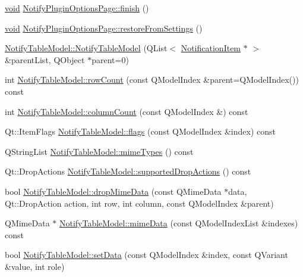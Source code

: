 \begin{DoxyCompactItemize}
\item 
\hyperlink{group___u_a_v_objects_plugin_ga444cf2ff3f0ecbe028adce838d373f5c}{void} \hyperlink{group___notify_plugin_gaa13ff08a62eca11b672d5f7d88fa7c40}{\-Notify\-Plugin\-Options\-Page\-::finish} ()
\item 
\hyperlink{group___u_a_v_objects_plugin_ga444cf2ff3f0ecbe028adce838d373f5c}{void} \hyperlink{group___notify_plugin_ga2607c7c5d3db72401fe48f07838d36ce}{\-Notify\-Plugin\-Options\-Page\-::restore\-From\-Settings} ()
\item 
\hyperlink{group___notify_plugin_ga7c99d26f6ccdab1cb80b8cfdfaa9d814}{\-Notify\-Table\-Model\-::\-Notify\-Table\-Model} (\-Q\-List$<$ \hyperlink{class_notification_item}{\-Notification\-Item} $\ast$ $>$ \&parent\-List, \-Q\-Object $\ast$parent=0)
\item 
int \hyperlink{group___notify_plugin_ga2bd35c3c39b4a7c057e00786a7ece129}{\-Notify\-Table\-Model\-::row\-Count} (const \-Q\-Model\-Index \&parent=\-Q\-Model\-Index()) const 
\item 
int \hyperlink{group___notify_plugin_gaf90f7b29e6b11f9e569df9adf0c0f01f}{\-Notify\-Table\-Model\-::column\-Count} (const \-Q\-Model\-Index \&) const 
\item 
\-Qt\-::\-Item\-Flags \hyperlink{group___notify_plugin_ga19b5a3d99feb4907b2332962b1468b9f}{\-Notify\-Table\-Model\-::flags} (const \-Q\-Model\-Index \&index) const 
\item 
\-Q\-String\-List \hyperlink{group___notify_plugin_ga8f52bed133220f83210db9d483d6aa26}{\-Notify\-Table\-Model\-::mime\-Types} () const 
\item 
\-Qt\-::\-Drop\-Actions \hyperlink{group___notify_plugin_gac83d6e04277e98b87cb42b0ab9b3c9be}{\-Notify\-Table\-Model\-::supported\-Drop\-Actions} () const 
\item 
bool \hyperlink{group___notify_plugin_ga623fe8a3346c4c0565352170fc44c4a9}{\-Notify\-Table\-Model\-::drop\-Mime\-Data} (const \-Q\-Mime\-Data $\ast$data, \-Qt\-::\-Drop\-Action action, int row, int column, const \-Q\-Model\-Index \&parent)
\item 
\-Q\-Mime\-Data $\ast$ \hyperlink{group___notify_plugin_gad898510a85b3055557ed33dc8e319b51}{\-Notify\-Table\-Model\-::mime\-Data} (const \-Q\-Model\-Index\-List \&indexes) const 
\item 
bool \hyperlink{group___notify_plugin_gafd2c78e02d0c8123cc83714a3a5ce595}{\-Notify\-Table\-Model\-::set\-Data} (const \-Q\-Model\-Index \&index, const \-Q\-Variant \&value, int role)
\item 

\end{DoxyCompactItemize}
